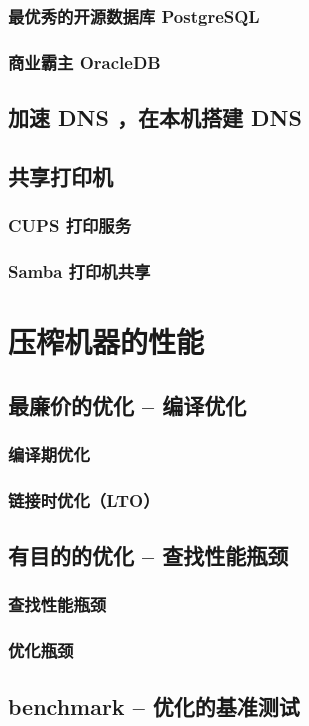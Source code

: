 \documentclass[amstex,twoside]{ctexbook}
\begin{document}
\subsection{  最优秀的开源数据库 PostgreSQL 	}
\subsection{  商业霸主 OracleDB	}
\section{  加速 DNS ，在本机搭建 DNS	}
\section{  共享打印机	}
\subsection{ CUPS 打印服务	}
\subsection{ Samba 打印机共享	}


\chapter{压榨机器的性能}
\section{  最廉价的优化 – 编译优化	}
\subsection{  编译期优化	}
\subsection{  链接时优化（LTO）	}
\section{  有目的的优化 – 查找性能瓶颈}
\subsection{ 查找性能瓶颈}
\subsection{  优化瓶颈}
\section{  benchmark – 优化的基准测试}
\end{document}
